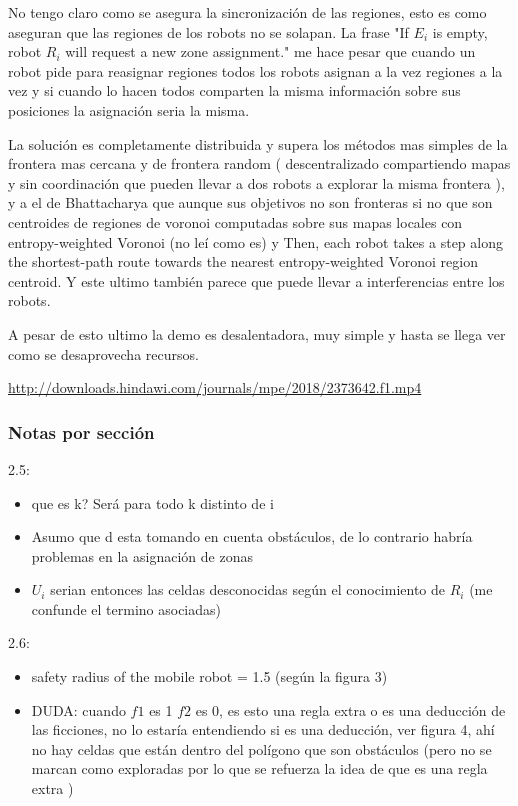 No tengo claro como se asegura la sincronización de las regiones, esto es como aseguran que las regiones de los robots no se solapan. La frase "If $E_i$ is empty, robot $R_i$ will request a new zone assignment." me hace pesar que cuando un robot pide para reasignar regiones todos los robots asignan a la vez regiones a la vez y si cuando lo hacen todos comparten la misma información sobre sus posiciones la asignación seria la misma.

La solución es completamente distribuida y supera los métodos mas simples de la frontera mas cercana y de frontera random ( descentralizado compartiendo mapas y sin coordinación que pueden llevar a dos robots a explorar la misma frontera ), y a el de Bhattacharya que aunque sus objetivos no son fronteras si no que son centroides de regiones de voronoi computadas sobre sus mapas locales con entropy-weighted Voronoi (no leí como es) y Then, each robot takes a step along the shortest-path route towards the nearest entropy-weighted Voronoi region centroid. Y este ultimo también parece que puede llevar a interferencias entre los robots.

A pesar de esto ultimo la demo es desalentadora, muy simple y hasta se llega ver como se desaprovecha recursos.

\url{http://downloads.hindawi.com/journals/mpe/2018/2373642.f1.mp4}

\subsubsection{Notas por sección}
2.5:
\begin{itemize}
  \item que es k? Será para todo k distinto de i
  \item  Asumo que d esta tomando en cuenta obstáculos, de lo contrario habría problemas en la asignación de zonas
  \item  $U_i$ serian entonces las celdas desconocidas según el conocimiento de $R_i$ (me confunde el termino asociadas)
\end{itemize}

2.6:
\begin{itemize}
  \item safety radius of the mobile robot = 1.5 (según la figura 3)
  \item DUDA: cuando $f1$ es 1 $f2$ es 0, es esto una regla extra o es una deducción de las ficciones, no lo estaría entendiendo si es una deducción, ver figura 4, ahí no hay celdas que están dentro del polígono que son obstáculos (pero no se marcan como exploradas por lo que se refuerza la idea de que es una regla extra )
\end{itemize}

